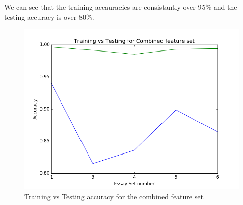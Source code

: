 \documentclass[BTech]{nitkdiss}
\begin{document}
We can see that the training accauracies are consistantly over 95\% and the testing accuracy is over 80\%. 

\begin{figure}[h!]
\centering
\includegraphics[scale=0.70]{TrainVTestComb.png}
\caption{Training vs Testing accuracy for the combined feature set}
\label{fig:CombVPrompt}
\end{figure}
\end{document}
